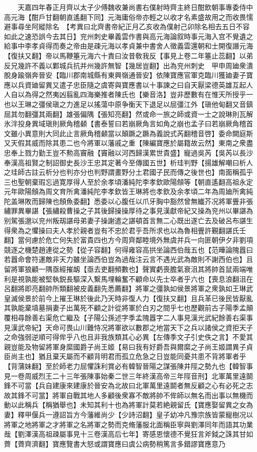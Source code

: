 　　天嘉四年春正月齊以太子少傅魏收兼尚書右僕射時齊主終日酣飲朝事專委侍中高元海【酣戶甘翻朝直遙翻下同】元海庸俗帝亦輕之以收才名素盛故用之而收畏懦避事尋坐阿縱除名　【考異曰北齊書帝紀正月乙亥收為僕射己卯除名相去五日不容如此之速恐誤今去其日】兖州刺史畢義雲作書與高元海論叙時事元海入宫不覺遺之給事中李孝貞得而奏之帝由是疎元海以孝貞兼中書舍人徵義雲還朝和士開復譖元海【復扶又翻】帝以馬鞭箠元海六十責曰汝昔敎我反【事見上卷二年箠止蕊翻】以弟反兄幾許不義以鄴城兵抗并州幾許無智【幾居豈翻】出為兖州刺史　甲申周廸衆潰脫身踰嶺奔晉安【臨川郡南城縣有東興嶺通晉安】依陳寶應官軍克臨川獲廸妻子寶應以兵資廸留異又遣子忠臣隨之虞寄與寶應書以十事諫之曰自天厭梁德英雄互起人人自以為得之然夷凶翦亂四海樂推者陳氏也【樂音洛】豈非歷數有在惟天所授乎一也以王琳之彊侯瑱之力進足以搖蕩中原争衡天下退足以屈彊江外【瑱他甸翻又音鎮屈其勿翻彊其兩翻】雄張偏隅【張知亮翻】然或命一旅之師或資一士之說琳則瓦解氷泮投身異域瑱則厥角稽顙【書泰誓曰若崩厥角言如角之崩也孟子曰若崩厥角稽首文雖小異意則大同此止言厥角稽顙當以顛蹶之蹶為義說式芮翻稽音啓】委命闕庭斯又天假其威而除其患二也今將軍以藩戚之重【陳編寶應於屬籍故云然】東南之衆盡忠奉上戮力勤王豈不勲高竇融【竇融以河西歸漢累世貴盛】寵過吳芮【吳芮以長沙奉漢高祖賢之制詔御史長沙王忠其定著今至傳國五世】析珪判野【揚雄解嘲曰析人之珪師古註云析分也判亦分也判野謂畫野分土君國子民而傳之後世也】南面稱孤乎三也聖朝棄瑕忘過寛厚得人至於余孝頃潘純陀李孝欽歐陽頠等【朝直遙翻高祖永定元年歐陽頠為周文育所禽潘純陀李孝欽皆王琳將也孝欽及余孝頃二年為周廸所禽純陀盖琳敗而歸陳也頠魚委翻】悉委以心腹任以爪牙胸中豁然曾無纎芥况將軍舋非張繡罪異畢諶【張繡殺曹操之子其後歸操操厚待之事見漢獻帝紀又操為兖州以畢諶為别駕張邈以兖州叛刼諶母弟妻子操謝遣之諶頓首言無二心既出遂亡去及破呂布諶生得衆為之懼操曰夫人孝於親者豈有不忠於君乎吾所求也以為魯相舋許覲翻諶氏壬翻】當何慮於危亡何失於富貴四也方今周齊鄰睦境外無虞并兵一向匪朝伊夕非劉項競逐之機楚趙連從之勢【從子容翻】何得雍容高拱坐論西伯哉五也【范曄論隗囂曰若囂命會符運敵非天力雖坐論西伯豈為過哉注云言不遇光武為敵則不謝西伯也】且留將軍狼顧一隅亟經摧衂【亟去吏翻頻數也】聲實虧喪膽氣衰沮其將帥首鼠兩端唯利是視孰能被堅執鋭長驅深入繫馬埋輪奮不顧命以先士卒者乎六也【喪息浪翻沮在呂翻將即亮翻帥所類翻被皮義翻先悉薦翻】將軍之彊孰如侯景將軍之衆孰如王琳武皇滅侯景於前今上摧王琳於後此乃天時非復人力【復扶又翻】且兵革已後民皆厭亂其孰能棄墳墓捐妻子出萬死不顧之計從將軍於白刃之間乎七也歷觀前古子陽季孟顛覆相尋餘善右渠危亡繼及【子陽公孫述字季孟隗囂字二人事見漢光武紀餘善右渠事見漢武帝紀】天命可畏山川難恃况將軍欲以數郡之地當天下之兵以諸侯之資拒天子之命強弱逆順可得侔乎八也且非我族類其心必異【左傳季文子引史佚之言】不愛其親豈能及物留將軍身縻國爵子尚王姬【易曰我有好爵吾與爾縻之子尚王姬謂異子貞臣尚主也】猶且棄天屬而不顧背明君而孤立危急之日豈能同憂共患不背將軍者乎【背蒲妹翻】至於師老力屈懼誅利賞必有韓智晉陽之謀張陳井陘之勢九也【韓智事見一卷周威烈王二十三年張陳事始秦二世三年終漢高帝三年陘音刑】北軍萬里遠鬬鋒不可當【兵自建康來建康於晉安為北故曰北軍萬里遠鬬者無反顧之心有必死之志故其鋒不可當】將軍自戰其地人多顧後衆寡不敵將帥不侔師以無名而出事以無機而動以此稱兵【稱猶舉也】未知其利十也為將軍計莫若絶親留氏【寶應娶留異之女為妻】釋甲偃兵一遵詔旨方今藩維尚少【少詩沼翻】皇子幼冲凡豫宗族皆蒙寵樹况以將軍之地將軍之才將軍之名將軍之勢而克脩藩服北面稱臣寧與劉澤同年而語其功業哉【劉澤漢高祖疎屬事見十三卷漢高后七年】寄感恩懷德不覺狂言斧鉞之誅其甘如薺【薺齊濟翻】寶應覽書大怒或謂寶應曰虞公病勢稍篤言多錯謬寶應意乃